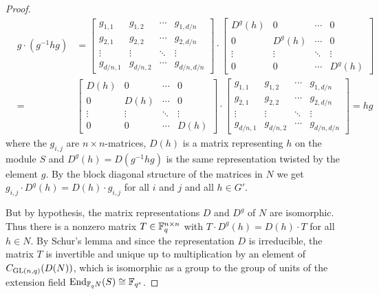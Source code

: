 \begin{proof}
\begin{eqnarray*}
   &g \cdot (g^{-1}hg) & 
 = \left[ \begin{array}{c|c|c|c}
      g_{1,1} & g_{1,2} & \cdots & g_{1,d/n} \\ \hline
      g_{2,1} & g_{2,2} & \cdots & g_{2,d/n} \\ \hline
      \vdots  & \vdots  & \ddots & \vdots    \\ \hline
      g_{d/n,1}&g_{d/n,2}& \cdots& g_{d/n,d/n} \end{array} \right]
\cdot \left[ \begin{array}{c|c|c|c}
      D^g(h) & 0   & \cdots &      0    \\ \hline
         0   &D^g(h)&\cdots &      0    \\ \hline
      \vdots  & \vdots  & \ddots & \vdots    \\ \hline
         0    &    0    & \cdots& D^g(h) \end{array} \right] \\
 &=& \left[ \begin{array}{c|c|c|c}
      D(h)    & 0       & \cdots &     0    \\ \hline
         0    &D(h)     &\cdots &      0    \\ \hline
      \vdots  & \vdots  & \ddots & \vdots    \\ \hline
         0    &    0    & \cdots& D(h)   \end{array} \right]
\cdot \left[ \begin{array}{c|c|c|c}
      g_{1,1} & g_{1,2} & \cdots & g_{1,d/n} \\ \hline
      g_{2,1} & g_{2,2} & \cdots & g_{2,d/n} \\ \hline
      \vdots  & \vdots  & \ddots & \vdots    \\ \hline
      g_{d/n,1}&g_{d/n,2}& \cdots& g_{d/n,d/n} \end{array} \right]
 = hg
\end{eqnarray*}
where the $g_{i,j}$ are $n \times n$-matrices, $D(h)$ is a matrix
representing $h$ on the module $S$ and $D^g(h) = D(g^{-1}hg)$ is the
same representation twisted by the element $g$. By the block diagonal
structure of the matrices in $N$ we get 
$g_{i,j} \cdot D^g(h) = D(h) \cdot g_{i,j}$ for all $i$ and $j$ and 
all $h \in G'$.

But by hypothesis, the matrix representations $D$ and $D^g$ of $N$
are isomorphic. Thus there is a nonzero matrix $T \in \mathbb{F}_q^{n \times n}$ with
$T \cdot D^g(h) = D(h) \cdot T$ for all $h \in N$. By Schur's lemma and
since the representation $D$ is irreducible,
the matrix $T$ is invertible and unique 
up to multiplication by an element of $C_{\GL(n,q)}(D(N))$, which
is isomorphic  as a group to the group of units of the extension field 
$\End_{\F_q N}(S) \cong \F_{q^e}$.


\end{proof}
